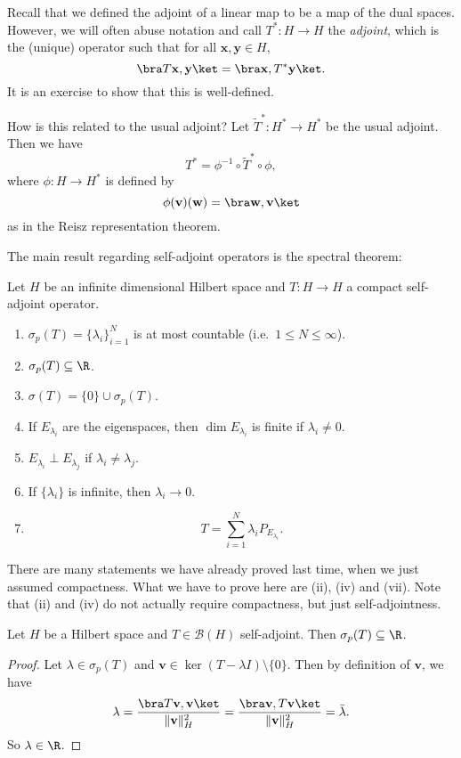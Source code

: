 \documentclass[a4paper]{article}
\begin{document}
Recall that we defined the adjoint of a linear map to be a map of the dual spaces. However, we will often abuse notation and call $T^*: H \to H$ the \emph{adjoint}, which is the (unique) operator such that for all $\mathbf{x}, \mathbf{y} \in H$,
\[
  \bra T \mathbf{x}, \mathbf{y}\ket = \bra \mathbf{x}, T^* \mathbf{y}\ket.
\]
It is an exercise to show that this is well-defined.

How is this related to the usual adjoint? Let $\tilde{T}^*: H^* \to H^*$ be the usual adjoint. Then we have
\[
  T^* = \phi^{-1} \circ \tilde{T}^* \circ \phi,
\]
where $\phi: H \to H^*$ is defined by
\[
  \phi(\mathbf{v})(\mathbf{w}) = \bra \mathbf{w}, \mathbf{v}\ket
\]
as in the Reisz representation theorem.

The main result regarding self-adjoint operators is the spectral theorem:
\begin{thm}
  Let $H$ be an infinite dimensional Hilbert space and $T: H \to H$ a compact self-adjoint operator.
  \begin{enumerate}
    \item $\sigma_p(T) = \{\lambda_i\}_{i = 1}^N$ is at most countable (i.e.\ $1 \leq N \leq \infty$).
    \item $\sigma_p(T) \subseteq \R$.
    \item $\sigma(T) = \{0\} \cup \sigma_p(T)$.
    \item If $E_{\lambda_i}$ are the eigenspaces, then $\dim E_{\lambda_i}$ is finite if $\lambda_i \not= 0$.
    \item $E_{\lambda_i} \perp E_{\lambda_j}$ if $\lambda_i \not= \lambda_j$.
    \item If $\{\lambda_i\}$ is infinite, then $\lambda_i \to 0$.
    \item
      \[
        T = \sum_{i = 1}^N \lambda_i P_{E_{\lambda_i}}.
      \]
  \end{enumerate}
\end{thm}
There are many statements we have already proved last time, when we just assumed compactness. What we have to prove here are (ii), (iv) and (vii). Note that (ii) and (iv) do not actually require compactness, but just self-adjointness.

\begin{prop}
  Let $H$ be a Hilbert space and $T \in \mathcal{B}(H)$ self-adjoint. Then $\sigma_p(T) \subseteq \R$.
\end{prop}

\begin{proof}
  Let $\lambda \in \sigma_p(T)$ and $\mathbf{v} \in \ker(T - \lambda I) \setminus \{0\}$. Then by definition of $\mathbf{v}$, we have
  \[
    \lambda = \frac{\bra T \mathbf{v}, \mathbf{v}\ket}{\|\mathbf{v}\|^2_H} = \frac{\bra \mathbf{v}, T \mathbf{v}\ket}{\|\mathbf{v}\|^2_H} = \bar{\lambda}.
  \]
  So $\lambda \in \R$.
\end{proof}
\end{document}
